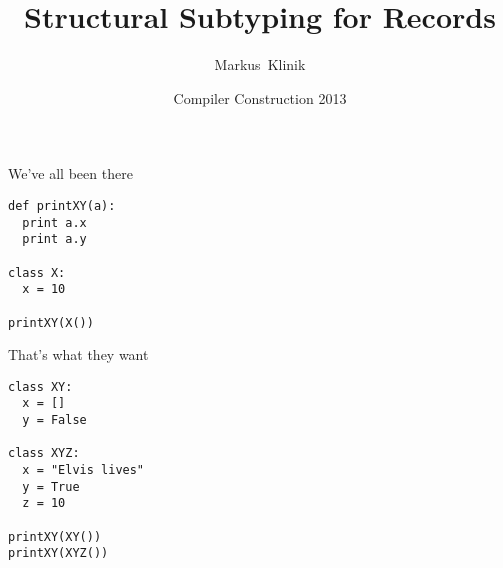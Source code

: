 \documentclass{beamer}
\title
{Structural Subtyping for Records}
\author
{Markus~Klinik}
\institute[Radboud University Nijmegen]
{
  Radboud University Nijmegen
}
\date
{Compiler Construction 2013}
\begin{document}
\begin{frame}
  \titlepage
\end{frame}

\begin{frame}[fragile]{We've all been there}

\begin{verbatim}
def printXY(a):
  print a.x
  print a.y

class X:
  x = 10

printXY(X())
\end{verbatim}

\end{frame}

\begin{frame}[fragile]{That's what they want}

\begin{verbatim}
class XY:
  x = []
  y = False

class XYZ:
  x = "Elvis lives"
  y = True
  z = 10

printXY(XY())
printXY(XYZ())
\end{verbatim}

\end{frame}
\end{document}
